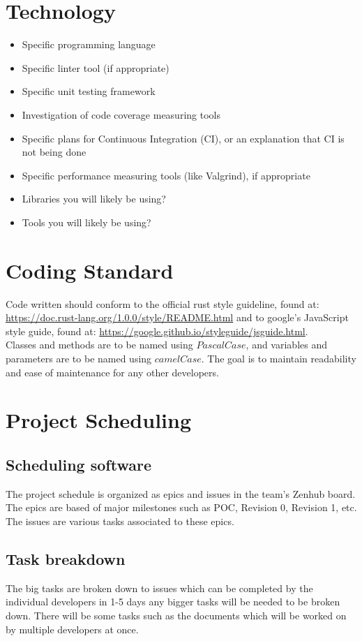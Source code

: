 \documentclass{article}
\begin{document}
\section{Technology}

\begin{itemize}
\item Specific programming language
\item Specific linter tool (if appropriate)
\item Specific unit testing framework
\item Investigation of code coverage measuring tools
\item Specific plans for Continuous Integration (CI), or an explanation that CI
  is not being done
\item Specific performance measuring tools (like Valgrind), if
  appropriate
\item Libraries you will likely be using?
\item Tools you will likely be using?
\end{itemize}

\section{Coding Standard}

Code written should conform to the official rust style guideline, found at: \url{https://doc.rust-lang.org/1.0.0/style/README.html} and to google's JavaScript style guide, found at: \url{https://google.github.io/styleguide/jsguide.html}.\\
Classes and methods are to be named using $PascalCase$, and variables and parameters are to be named using $camelCase$.
\newline
The goal is to maintain readability and ease of maintenance for any other developers.

\section{Project Scheduling}
\subsection{Scheduling software}
The project schedule is organized as epics and issues in the team's Zenhub board. The epics are based of major milestones such as POC, Revision 0, Revision 1, etc. The issues are various tasks associated to these epics.
\subsection{Task breakdown}
The big tasks are broken down to issues which can be completed by the individual developers in 1-5 days any bigger tasks will be needed to be broken down. There will be some tasks such as the documents which will be worked on by multiple developers at once.
\end{document}
